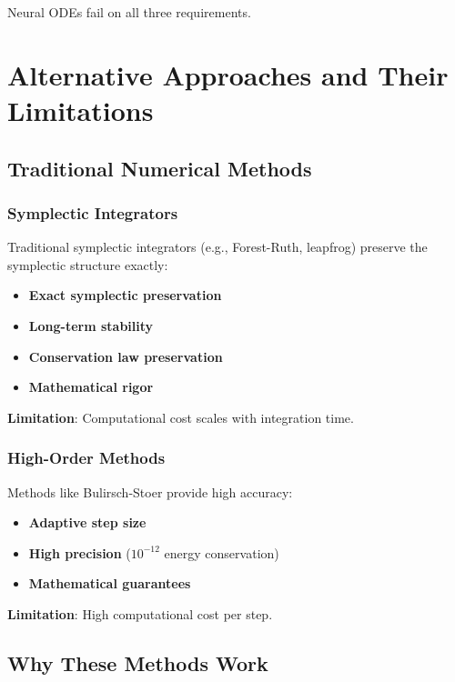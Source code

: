 \documentclass[11pt,a4paper]{article}
\begin{document}
Neural ODEs fail on all three requirements.

\section{Alternative Approaches and Their Limitations}

\subsection{Traditional Numerical Methods}

\subsubsection{Symplectic Integrators}

Traditional symplectic integrators (e.g., Forest-Ruth, leapfrog) preserve the symplectic structure exactly:

\begin{itemize}
    \item \textbf{Exact symplectic preservation}
    \item \textbf{Long-term stability}
    \item \textbf{Conservation law preservation}
    \item \textbf{Mathematical rigor}
\end{itemize}

\textbf{Limitation}: Computational cost scales with integration time.

\subsubsection{High-Order Methods}

Methods like Bulirsch-Stoer provide high accuracy:
\begin{itemize}
    \item \textbf{Adaptive step size}
    \item \textbf{High precision} ($10^{-12}$ energy conservation)
    \item \textbf{Mathematical guarantees}
\end{itemize}

\textbf{Limitation}: High computational cost per step.

\subsection{Why These Methods Work}
\end{document}
